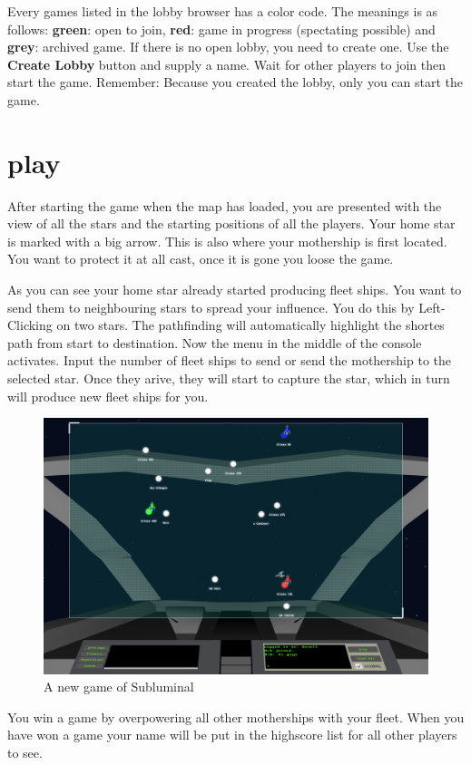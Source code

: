 \noindent Every games listed in the lobby browser has a color code. The meanings is as follows: \textbf{green}: open to join, \textbf{red}: game in progress (spectating possible) and \textbf{grey}: archived game. If there is no open lobby, you need to create one. Use the \textbf{Create Lobby} button and supply a name. Wait for other players to join then start the game. Remember: Because you created the lobby, only you can start the game.

\section*{play}
After starting the game when the map has loaded, you are presented with the view of all the stars and the starting positions of all the players. Your home star is marked with a big arrow. This is also where your mothership is first located. You want to protect it at all cast, once it is gone you loose the game. 

As you can see your home star already started producing fleet ships. You want to send them to neighbouring stars to spread your influence. You do this by Left-Clicking on two stars. The pathfinding will automatically highlight the shortes path from start to destination. Now the menu in the middle of the console activates. Input the number of fleet ships to send or send the mothership to the selected star. Once they arive, they will start to capture the star, which in turn will produce new fleet ships for you.
\begin{figure}[!ht]
	\centering
	\includegraphics[width=.85\textwidth]{chapters/gamerules/gamestart.png}
	\caption*{A new game of Subluminal}
\end{figure}

You win a game by overpowering all other motherships with your fleet. When you have won a game your name will be put in the highscore list for all other players to see.


